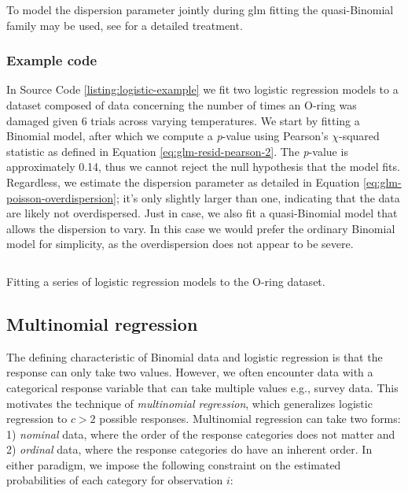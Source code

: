 \documentclass{report}
\begin{document}
To model the dispersion parameter jointly during \gls{glm} fitting the quasi-Binomial family may be used, see \cite[Chapter~3.5]{faraway_extending_2016} for a detailed treatment. 

\subsubsection{Example code}

In Source Code \ref{listing:logistic-example} we fit two logistic regression models to a dataset composed of data concerning the number of times an O-ring was damaged given 6 trials across varying temperatures. We start by fitting a Binomial model, after which we compute a \textit{p}-value using Pearson's $\chi$-squared statistic as defined in Equation \ref{eq:glm-resid-pearson-2}. The \textit{p}-value is approximately 0.14, thus we cannot reject the null hypothesis that the model fits. Regardless, we estimate the dispersion parameter as detailed in Equation \ref{eq:glm-poisson-overdispersion}; it's only slightly larger than one, indicating that the data are likely not overdispersed. Just in case, we also fit a quasi-Binomial model that allows the dispersion to vary. In this case we would prefer the ordinary Binomial model for simplicity, as the overdispersion does not appear to be severe. 

\begin{listing}[h!]
\inputminted{r}{Example-Code/quasi_binomial.R}
\caption{Fitting a series of logistic regression models to the O-ring dataset.}
\label{listing:logistic-example}
\end{listing}

\subsection{Multinomial regression}

The defining characteristic of Binomial data and logistic regression is that the response can only take two values. However, we often encounter data with a categorical response variable that can take multiple values e.g., survey data. This motivates the technique of \textit{multinomial regression}, which generalizes logistic regression to $c > 2$ possible responses. Multinomial regression can take two forms: 1) \textit{nominal} data, where the order of the response categories does not matter and 2) \textit{ordinal} data, where the response categories do have an inherent order. In either paradigm, we impose the following constraint on the estimated probabilities of each category for observation $i$:
\end{document}
